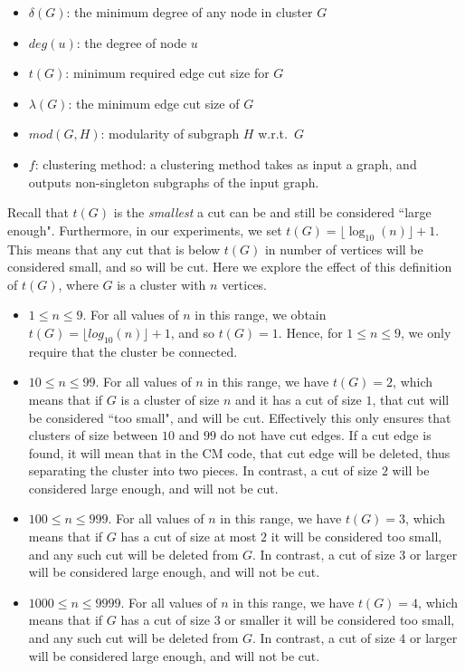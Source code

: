 \documentclass[12pt, oneside]{article}   	%
\begin{document}
\begin{itemize}
    \item $\delta(G)$: the minimum degree of  any node in cluster $G$
    \item $deg(u)$: the degree of node $u$
    \item $t(G)$: minimum required edge cut size for  $G$
    \item $\lambda(G)$: the minimum edge cut size of $G$
    \item $mod(G, H)$: modularity of subgraph $H$ w.r.t.~$G$
    \item $f$: clustering method: a clustering method takes as input a graph, and outputs non-singleton subgraphs of the input graph.  
\end{itemize}

Recall that  $t(G)$ is the {\em smallest} a cut can be and still be considered ``large enough".
Furthermore, in our experiments, we set $t(G) = \lfloor \log_{10}(n) \rfloor +1$.  This means that any cut that is below $t(G)$ in number of vertices
will be considered small, and so will be cut.
Here we explore the effect of this definition of $t(G)$, where $G$ is a cluster with $n$ vertices.
\begin{itemize}
\item 
$1 \leq n \leq 9$. 
For all values of $n$ in this range, we obtain $t(G) = \lfloor log_{10}(n) \rfloor +1$, and so $t(G) = 1$.  Hence, for $1 \leq n \leq 9$, we  only require that the
cluster be connected.
\item 
$10 \leq n \leq 99$. For all values of $n$ in this range, we have 
 $t(G) = 2$, which means that if $G$ is a cluster of size $n$ and it has a cut of size $1$, that  cut will
be considered ``too small", and will be cut.  Effectively this only ensures that clusters of size between $10$ and $99$ do not have cut edges.
If a cut edge is found, it will mean that in the CM code, that cut edge will be deleted, thus separating the cluster into two pieces.
In contrast, a cut of size $2$ will be considered large enough, and will not be cut.
\item 
$100 \leq n \leq 999$.
For all values of $n$ in this range, we have $t(G)=3$, which means that if $G$ has a cut of size  at most $2$ it will be considered
too small, and any such cut will be deleted from $G$.
In contrast, a cut of size $3$  or larger will be considered large enough, and will not be cut.
\item 
$1000 \leq n \leq 9999$.
For all values of $n$ in this range, we have $t(G)=4$, which means that if $G$ has a cut of size $3$ or smaller it will be considered
too small, and any such cut will be deleted from $G$.
In contrast, a cut of size $4$ or larger will be considered large enough, and will not be cut.
\end{itemize}
\end{document}
